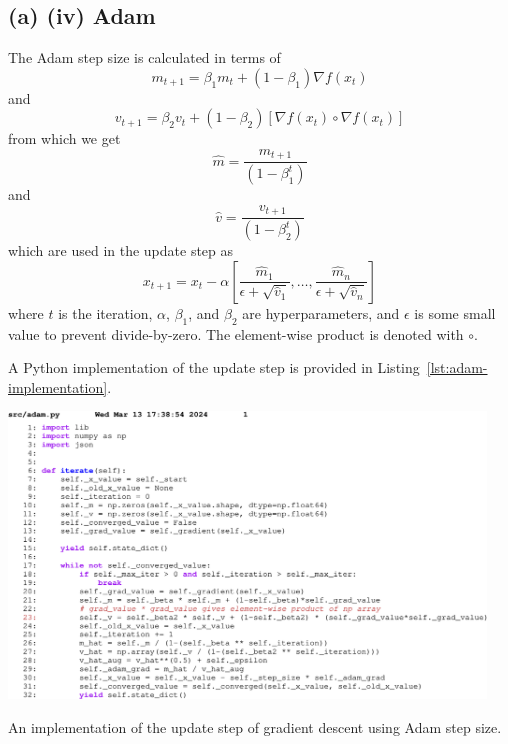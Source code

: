 \subsection{(a) (iv) Adam}

The Adam step size is calculated in terms of
\begin{equation}
  m_{t+1}=\beta_1m_t+(1-\beta_1)\nabla f(x_t)
\end{equation}
and \begin{equation}
  v_{t+1}=\beta_2v_t+(1-\beta_2)[\nabla f(x_t) \circ \nabla f(x_t)]
\end{equation}
from which we get
\begin{equation}
  \hat m=\frac{m_{t+1}}{(1-\beta_1^t)}
\end{equation}
and
\begin{equation}
  \hat v=\frac{v_{t+1}}{(1-\beta_2^t)}
\end{equation}
which are used in the update step as
\begin{equation}
  x_{t+1}=x_t-\alpha[\frac{\hat m_1}{\epsilon + \sqrt{\hat v_1}},\ldots,\frac{\hat m_n}{\epsilon + \sqrt{\hat v_n}}]
\end{equation}
where $t$ is the iteration, $\alpha$, $\beta_1$, and $\beta_2$ are hyperparameters, and $\epsilon$ is some small value to prevent divide-by-zero. The element-wise product is denoted with $\circ$.


A Python implementation of the update step is provided in Listing~\ref{lst:adam-implementation}.

\begin{listing}
  \begin{center}
    \includegraphics[width=0.95\textwidth]{fig/adam-code.pdf}
  \end{center}
  \caption{An implementation of the update step of gradient descent using Adam step size.}\label{lst:adam-implementation}
\end{listing}

